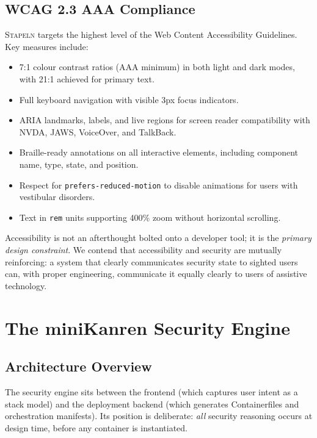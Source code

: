 \documentclass[11pt,twocolumn]{article}
\newcommand{\stapeln}{\textsc{Stapeln}\xspace}
\begin{document}
\subsection{WCAG 2.3 AAA Compliance}
\label{sec:acc-wcag}

\stapeln targets the highest level of the Web Content Accessibility
Guidelines. Key measures include:

\begin{itemize}[leftmargin=*]
\item 7:1 colour contrast ratios (AAA minimum) in both light and dark
      modes, with 21:1 achieved for primary text.
\item Full keyboard navigation with visible 3px focus indicators.
\item ARIA landmarks, labels, and live regions for screen reader
      compatibility with NVDA, JAWS, VoiceOver, and TalkBack.
\item Braille-ready annotations on all interactive elements, including
      component name, type, state, and position.
\item Respect for \texttt{prefers-reduced-motion} to disable
      animations for users with vestibular disorders.
\item Text in \texttt{rem} units supporting 400\% zoom without
      horizontal scrolling.
\end{itemize}

Accessibility is not an afterthought bolted onto a developer tool;
it is the \emph{primary design constraint}. We contend that
accessibility and security are mutually reinforcing: a system that
clearly communicates security state to sighted users can, with proper
engineering, communicate it equally clearly to users of assistive
technology.


\section{The miniKanren Security Engine}
\label{sec:engine}

\subsection{Architecture Overview}
\label{sec:engine-arch}

The security engine sits between the frontend (which captures user
intent as a stack model) and the deployment backend (which generates
Containerfiles and orchestration manifests). Its position is
deliberate: \emph{all} security reasoning occurs at design time,
before any container is instantiated.
\end{document}
